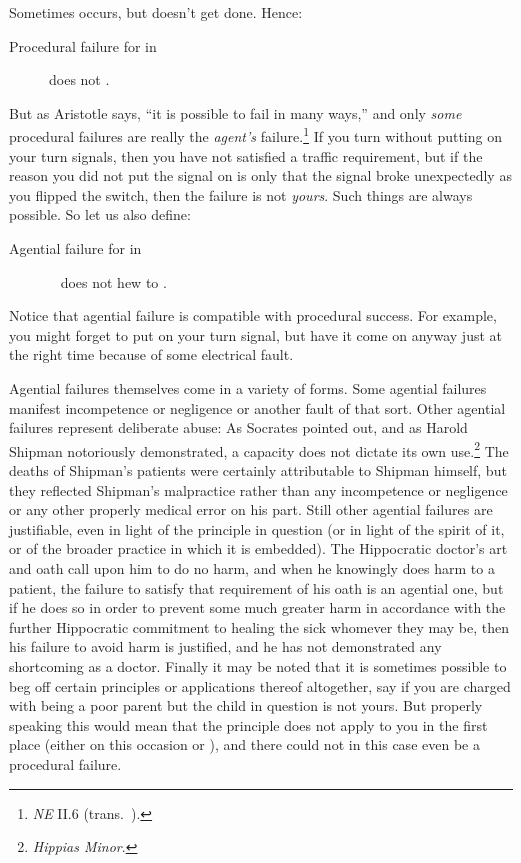 \documentclass[11pt,letterpaper,oneside]{amsart}
\begin{document}
Sometimes  occurs, but  doesn't get done. Hence:\begin{description}\item[Procedural failure for  in ]  does not .\end{description} But as Aristotle says, ``it is possible to fail in many ways,'' and only \emph{some} procedural failures are really the \emph{agent's} failure.\footnote{\emph{NE} II.6 (trans.\ ).} If you turn without putting on your turn signals, then you have not satisfied a traffic requirement, but if the reason you did not put the signal on is only that the signal broke unexpectedly as you flipped the switch, then the failure is not \emph{yours}. Such things are always possible. So let us also define:\begin{description}\item[Agential failure for  in ] \  does not hew to .\end{description} Notice that agential failure is compatible with procedural success. For example, you might forget to put on your turn signal, but have it come on anyway just at the right time because of some electrical fault.





Agential failures themselves come in a variety of forms. Some agential failures manifest incompetence or negligence or another fault of that sort. Other agential failures represent deliberate abuse: As Socrates pointed out, and as Harold Shipman notoriously demonstrated, a capacity does not dictate its own use.\footnote{\emph{Hippias Minor}.} The deaths of Shipman's patients were certainly attributable to Shipman himself, but they reflected Shipman's malpractice rather than any incompetence or negligence or any other properly medical error on his part. Still other agential failures are justifiable, even in light of the principle in question (or in light of the spirit of it, or of the broader practice in which it is embedded). The Hippocratic doctor's art and oath call upon him to do no harm, and when he knowingly does harm to a patient, the failure to satisfy that requirement of his oath is an agential one, but if he does so in order to prevent some much greater harm in accordance with the further Hippocratic commitment to healing the sick whomever they may be, then his failure to avoid harm is justified, and he has not demonstrated any shortcoming as a doctor. Finally it may be noted that it is sometimes possible to beg off certain principles or applications thereof altogether, say if you are charged with being a poor parent but the child in question is not yours. But properly speaking this would mean that the principle does not apply to you in the first place (either on this occasion or ), and there could not in this case even be a procedural failure.
\end{document}
